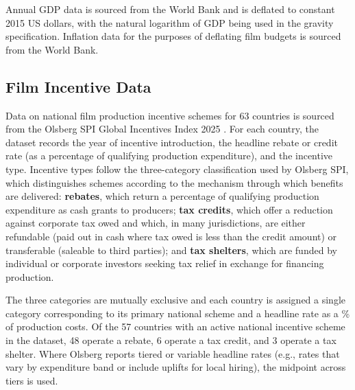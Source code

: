 Annual GDP data is sourced from the World Bank and is deflated to constant 2015 US dollars, with the natural logarithm of GDP being used in the gravity specification. Inflation data for the purposes of deflating film budgets is sourced from the World Bank.

\subsection{Film Incentive Data}
\label{sec:data_incentives}

Data on national film production incentive schemes for 63 countries is sourced from the Olsberg SPI Global Incentives Index 2025 \citep{olsberg2025}. For each country, the dataset records the year of incentive introduction, the headline rebate or credit rate (as a percentage of qualifying production expenditure), and the incentive type. Incentive types follow the three-category classification used by Olsberg SPI, which distinguishes schemes according to the mechanism through which benefits are delivered: \textbf{rebates}, which return a percentage of qualifying production expenditure as cash grants to producers; \textbf{tax credits}, which offer a reduction against corporate tax owed and which, in many jurisdictions, are either refundable (paid out in cash where tax owed is less than the credit amount) or transferable (saleable to third parties); and \textbf{tax shelters}, which are funded by individual or corporate investors seeking tax relief in exchange for financing production.

The three categories are mutually exclusive and each country is assigned a single category corresponding to its primary national scheme and a headline rate as a \% of production costs. Of the 57 countries with an active national incentive scheme in the dataset, 48 operate a rebate, 6 operate a tax credit, and 3 operate a tax shelter. Where Olsberg reports tiered or variable headline rates (e.g., rates that vary by expenditure band or include uplifts for local hiring), the midpoint across tiers is used.
